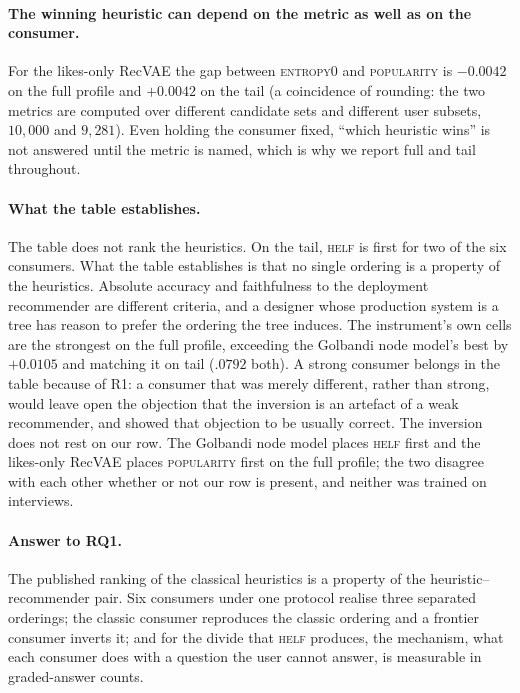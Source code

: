 \documentclass[manuscript,screen,review]{acmart}
\begin{document}
\paragraph{The winning heuristic can depend on the metric as well as on the consumer.} For the likes-only RecVAE the gap between \textsc{entropy0} and \textsc{popularity} is $-0.0042$ on the full profile and $+0.0042$ on the tail (a coincidence of rounding: the two metrics are computed over different candidate sets and different user subsets, $10{,}000$ and $9{,}281$). Even holding the consumer fixed, ``which heuristic wins'' is not answered until the metric is named, which is why we report full and tail throughout.

\paragraph{What the table establishes.} The table does not rank the heuristics. On the tail, \textsc{helf} is first for two of the six consumers. What the table establishes is that no single ordering is a property of the heuristics. Absolute accuracy and faithfulness to the deployment recommender are different criteria, and a designer whose production system is a tree has reason to prefer the ordering the tree induces. The instrument's own cells are the strongest on the full profile, exceeding the Golbandi node model's best by $+0.0105$ and matching it on tail ($.0792$ both). A strong consumer belongs in the table because of R1: a consumer that was merely different, rather than strong, would leave open the objection that the inversion is an artefact of a weak recommender, and \citet{dacrema2019progress} showed that objection to be usually correct. The inversion does not rest on our row. The Golbandi node model places \textsc{helf} first and the likes-only RecVAE places \textsc{popularity} first on the full profile; the two disagree with each other whether or not our row is present, and neither was trained on interviews.

\paragraph{Answer to RQ1.} The published ranking of the classical heuristics is a property of the heuristic--recommender pair. Six consumers under one protocol realise three separated orderings; the classic consumer reproduces the classic ordering and a frontier consumer inverts it; and for the divide that \textsc{helf} produces, the mechanism, what each consumer does with a question the user cannot answer, is measurable in graded-answer counts.
\end{document}
